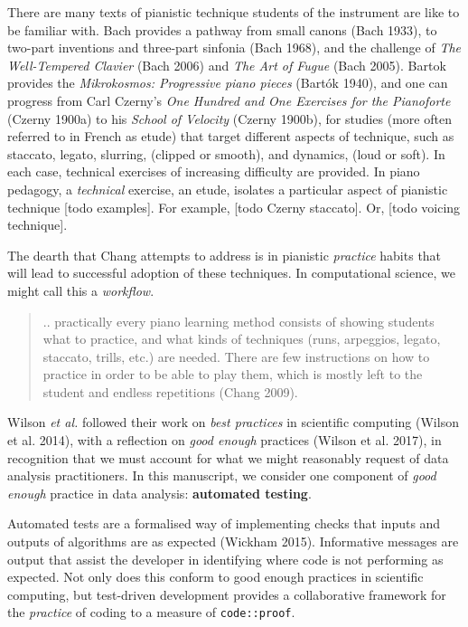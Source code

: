 \documentclass[
]{article}
\begin{document}
There are many texts of pianistic technique students of the instrument are like to be familiar with. Bach provides a pathway from small canons (Bach 1933), to two-part inventions and three-part sinfonia (Bach 1968), and the challenge of \emph{The Well-Tempered Clavier} (Bach 2006) and \emph{The Art of Fugue} (Bach 2005). Bartok provides the \emph{Mikrokosmos: Progressive piano pieces} (Bartók 1940), and one can progress from Carl Czerny's \emph{One Hundred and One Exercises for the Pianoforte} (Czerny 1900a) to his \emph{School of Velocity} (Czerny 1900b), for studies (more often referred to in French as etude) that target different aspects of technique, such as staccato, legato, slurring, (clipped or smooth), and dynamics, (loud or soft). In each case, technical exercises of increasing difficulty are provided. In piano pedagogy, a \emph{technical} exercise, an etude, isolates a particular aspect of pianistic technique {[}todo examples{]}. For example, {[}todo Czerny staccato{]}. Or, {[}todo voicing technique{]}.

The dearth that Chang attempts to address is in pianistic \emph{practice} habits that will lead to successful adoption of these techniques. In computational science, we might call this a \emph{workflow}.

\begin{quote}
.. practically every piano learning method consists of showing students what to practice, and what kinds of techniques (runs, arpeggios, legato, staccato, trills, etc.) are needed. There are few instructions on how to practice in order to be able to play them, which is mostly left to the student and endless repetitions (Chang 2009).
\end{quote}

Wilson \emph{et al.} followed their work on \emph{best practices} in scientific computing (Wilson et al. 2014), with a reflection on \emph{good enough} practices (Wilson et al. 2017), in recognition that we must account for what we might reasonably request of data analysis practitioners. In this manuscript, we consider one component of \emph{good enough} practice in data analysis: \textbf{automated testing}.

Automated tests are a formalised way of implementing checks that inputs and outputs of algorithms are as expected (Wickham 2015). Informative messages are output that assist the developer in identifying where code is not performing as expected. Not only does this conform to good enough practices in scientific computing, but test-driven development provides a collaborative framework for the \emph{practice} of coding to a measure of \texttt{code::proof}.
\end{document}
